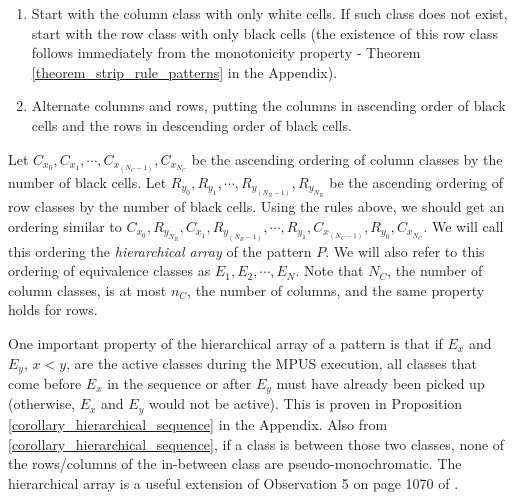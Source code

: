 \begin{enumerate}

\item Start with the column class with only white cells. If such class does not exist, start with the row class with only black cells  (the existence of
this row class follows immediately from the monotonicity property -
Theorem \ref{theorem_strip_rule_patterns} in the Appendix).

\item Alternate columns and rows, putting the columns in ascending order of black cells and the rows in descending order of black cells.

\end{enumerate}

Let $C_{x_{0}}, C_{x_{1}}, \cdots, C_{x_{(N_{C}-1)}}, C_{x_{N_{C}}}$ be the ascending ordering of column classes by the number of black cells. Let $R_{y_{0}}, R_{y_{1}}, \cdots, R_{y_{(N_{R}-1)}}, R_{y_{N_{R}}}$ be the ascending ordering of row classes by the number of black cells. Using the rules above, we should get an ordering similar to $C_{x_{0}}, R_{y_{N_{R}}}, C_{x_{1}}, R_{y_{(N_{R}-1)}}, \cdots, R_{y_{1}}, C_{x_{(N_{C}-1)}}, R_{y_{0}}, C_{x_{N_{C}}}$. We will call this ordering the {\em hierarchical array} of the pattern $P$. We will also refer to this ordering of equivalence classes as $E_{1}, E_{2}, \cdots, E_{N}$.
Note that $N_C$, the number of column classes, is at most $n_C$,
the number of columns, and the same property holds for rows.

One important property of the hierarchical array of a pattern is that if $E_{x}$ and $E_{y}$, $x < y$, are the active classes during the MPUS execution, all classes that come before $E_{x}$ in the sequence or after $E_{y}$ must have already been picked up (otherwise, $E_{x}$ and $E_{y}$ would not be active).
This is proven in Proposition \ref{corollary_hierarchical_sequence}
in the Appendix.
Also from \ref{corollary_hierarchical_sequence}, if a class is between those two classes, none of the rows/columns of the in-between class
are pseudo-monochromatic.
The hierarchical array is a useful extension of Observation 5 on page
1070 of \cite{ACJKLW07}.

